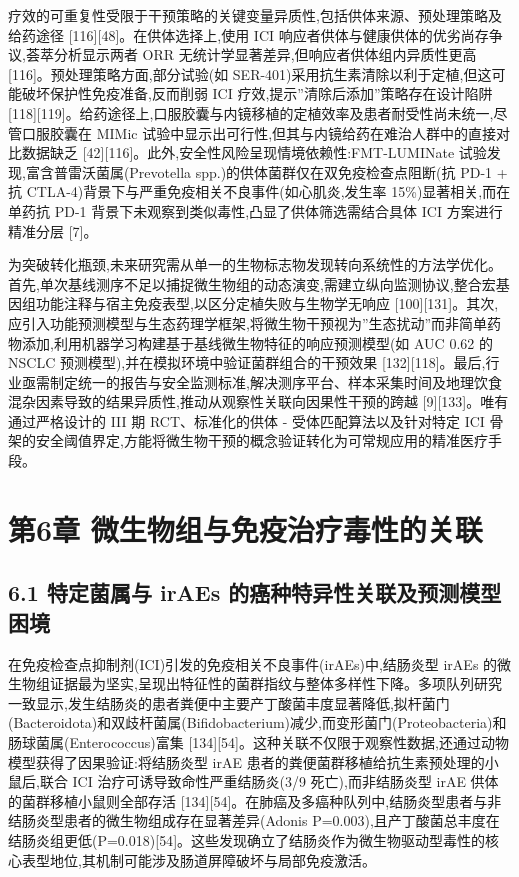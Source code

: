 疗效的可重复性受限于干预策略的关键变量异质性,包括供体来源、预处理策略及给药途径 {[}116{]}{[}48{]}。在供体选择上,使用 ICI 响应者供体与健康供体的优劣尚存争议,荟萃分析显示两者 ORR 无统计学显著差异,但响应者供体组内异质性更高 {[}116{]}。预处理策略方面,部分试验(如 SER-401)采用抗生素清除以利于定植,但这可能破坏保护性免疫准备,反而削弱 ICI 疗效,提示''清除后添加''策略存在设计陷阱 {[}118{]}{[}119{]}。给药途径上,口服胶囊与内镜移植的定植效率及患者耐受性尚未统一,尽管口服胶囊在 MIMic 试验中显示出可行性,但其与内镜给药在难治人群中的直接对比数据缺乏 {[}42{]}{[}116{]}。此外,安全性风险呈现情境依赖性:FMT-LUMINate 试验发现,富含普雷沃菌属(Prevotella spp.)的供体菌群仅在双免疫检查点阻断(抗 PD-1 + 抗 CTLA-4)背景下与严重免疫相关不良事件(如心肌炎,发生率 15\%)显著相关,而在单药抗 PD-1 背景下未观察到类似毒性,凸显了供体筛选需结合具体 ICI 方案进行精准分层 {[}7{]}。

为突破转化瓶颈,未来研究需从单一的生物标志物发现转向系统性的方法学优化。首先,单次基线测序不足以捕捉微生物组的动态演变,需建立纵向监测协议,整合宏基因组功能注释与宿主免疫表型,以区分定植失败与生物学无响应 {[}100{]}{[}131{]}。其次,应引入功能预测模型与生态药理学框架,将微生物干预视为''生态扰动''而非简单药物添加,利用机器学习构建基于基线微生物特征的响应预测模型(如 AUC 0.62 的 NSCLC 预测模型),并在模拟环境中验证菌群组合的干预效果 {[}132{]}{[}118{]}。最后,行业亟需制定统一的报告与安全监测标准,解决测序平台、样本采集时间及地理饮食混杂因素导致的结果异质性,推动从观察性关联向因果性干预的跨越 {[}9{]}{[}133{]}。唯有通过严格设计的 III 期 RCT、标准化的供体 - 受体匹配算法以及针对特定 ICI 骨架的安全阈值界定,方能将微生物干预的概念验证转化为可常规应用的精准医疗手段。

\section{第6章 微生物组与免疫治疗毒性的关联}\label{ux7b2c6ux7ae0-ux5faeux751fux7269ux7ec4ux4e0eux514dux75abux6cbbux7597ux6bd2ux6027ux7684ux5173ux8054}

\subsection{6.1 特定菌属与 irAEs 的癌种特异性关联及预测模型困境}\label{ux7279ux5b9aux83ccux5c5eux4e0e-iraes-ux7684ux764cux79cdux7279ux5f02ux6027ux5173ux8054ux53caux9884ux6d4bux6a21ux578bux56f0ux5883}

在免疫检查点抑制剂(ICI)引发的免疫相关不良事件(irAEs)中,结肠炎型 irAEs 的微生物组证据最为坚实,呈现出特征性的菌群指纹与整体多样性下降。多项队列研究一致显示,发生结肠炎的患者粪便中主要产丁酸菌丰度显著降低,拟杆菌门(Bacteroidota)和双歧杆菌属(Bifidobacterium)减少,而变形菌门(Proteobacteria)和肠球菌属(Enterococcus)富集 {[}134{]}{[}54{]}。这种关联不仅限于观察性数据,还通过动物模型获得了因果验证:将结肠炎型 irAE 患者的粪便菌群移植给抗生素预处理的小鼠后,联合 ICI 治疗可诱导致命性严重结肠炎(3/9 死亡),而非结肠炎型 irAE 供体的菌群移植小鼠则全部存活 {[}134{]}{[}54{]}。在肺癌及多癌种队列中,结肠炎型患者与非结肠炎型患者的微生物组成存在显著差异(Adonis P=0.003),且产丁酸菌总丰度在结肠炎组更低(P=0.018){[}54{]}。这些发现确立了结肠炎作为微生物驱动型毒性的核心表型地位,其机制可能涉及肠道屏障破坏与局部免疫激活。

